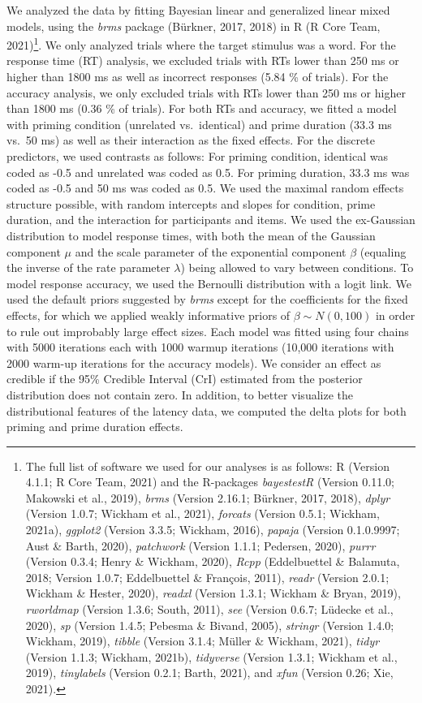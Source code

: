 \documentclass[
  english,
  man,floatsintext]{apa6}
\begin{document}
We analyzed the data by fitting Bayesian linear and generalized linear mixed models, using the \emph{brms} package (Bürkner, 2017, 2018) in R (R Core Team, 2021)\footnote{The full list of software we used for our analyses is as follows: R (Version 4.1.1; R Core Team, 2021) and the R-packages \emph{bayestestR} (Version 0.11.0; Makowski et al., 2019), \emph{brms} (Version 2.16.1; Bürkner, 2017, 2018), \emph{dplyr} (Version 1.0.7; Wickham et al., 2021), \emph{forcats} (Version 0.5.1; Wickham, 2021a), \emph{ggplot2} (Version 3.3.5; Wickham, 2016), \emph{papaja} (Version 0.1.0.9997; Aust \& Barth, 2020), \emph{patchwork} (Version 1.1.1; Pedersen, 2020), \emph{purrr} (Version 0.3.4; Henry \& Wickham, 2020), \emph{Rcpp} (Eddelbuettel \& Balamuta, 2018; Version 1.0.7; Eddelbuettel \& François, 2011), \emph{readr} (Version 2.0.1; Wickham \& Hester, 2020), \emph{readxl} (Version 1.3.1; Wickham \& Bryan, 2019), \emph{rworldmap} (Version 1.3.6; South, 2011), \emph{see} (Version 0.6.7; Lüdecke et al., 2020), \emph{sp} (Version 1.4.5; Pebesma \& Bivand, 2005), \emph{stringr} (Version 1.4.0; Wickham, 2019), \emph{tibble} (Version 3.1.4; Müller \& Wickham, 2021), \emph{tidyr} (Version 1.1.3; Wickham, 2021b), \emph{tidyverse} (Version 1.3.1; Wickham et al., 2019), \emph{tinylabels} (Version 0.2.1; Barth, 2021), and \emph{xfun} (Version 0.26; Xie, 2021).}. We only analyzed trials where the target stimulus was a word. For the response time (RT) analysis, we excluded trials with RTs lower than 250 ms or higher than 1800 ms as well as incorrect responses (5.84 \% of trials). For the accuracy analysis, we only excluded trials with RTs lower than 250 ms or higher than 1800 ms (0.36 \% of trials). For both RTs and accuracy, we fitted a model with priming condition (unrelated vs.~identical) and prime duration (33.3 ms vs.~50 ms) as well as their interaction as the fixed effects. For the discrete predictors, we used contrasts as follows: For priming condition, identical was coded as -0.5 and unrelated was coded as 0.5. For priming duration, 33.3 ms was coded as -0.5 and 50 ms was coded as 0.5. We used the maximal random effects structure possible, with random intercepts and slopes for condition, prime duration, and the interaction for participants and items. We used the ex-Gaussian distribution to model response times, with both the mean of the Gaussian component \(\mu\) and the scale parameter of the exponential component \(\beta\) (equaling the inverse of the rate parameter \(\lambda\)) being allowed to vary between conditions. To model response accuracy, we used the Bernoulli distribution with a logit link. We used the default priors suggested by \emph{brms} except for the coefficients for the fixed effects, for which we applied weakly informative priors of \(\beta \sim N(0,100)\) in order to rule out improbably large effect sizes. Each model was fitted using four chains with 5000 iterations each with 1000 warmup iterations (10,000 iterations with 2000 warm-up iterations for the accuracy models). We consider an effect as credible if the 95\% Credible Interval (CrI) estimated from the posterior distribution does not contain zero. In addition, to better visualize the distributional features of the latency data, we computed the delta plots for both priming and prime duration effects.
\end{document}
